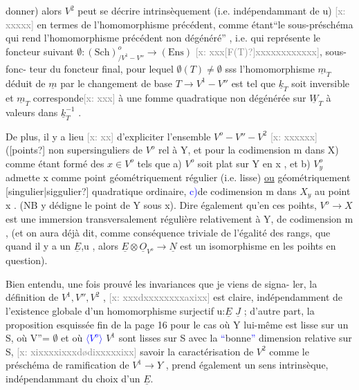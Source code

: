 \documentclass[11pt]{article}
\newcommand{\scanpage}[1]{\par\bigskip\noindent{\small\sffamily[scan #1]}\par}
\newcommand{\mspage}[1]{{\small\sffamily[p.\,#1]}}
\newcommand{\hand}[1]{\textcolor{blue}{#1}}
\newcommand{\inserted}[2][]{\textcolor{blue}{$\langle$#2$\rangle$}}
\newcommand{\xout}[1]{\textcolor{gray}{[\textsf{x:} #1]}}
\newcommand{\uline}[1]{\underline{#1}}
\newcommand{\unsure}[1]{[#1?]}
\begin{document}
\mspage{\hand{169}}

\clearpage
\scanpage{25/170}
\mspage{\hand{5}}
donner) alors $V^2$ peut se décrire intrinsèquement (i.e. indépendammant de u)
\xout{xxxxx} en termes de l'homomorphisme précédent, comme étant``le sous-préschéma
qui rend l'homomorphisme précédent non dégénéré'' , i.e. qui représente le
foncteur suivant $\emptyset : (\mathrm{Sch})^{o}_{/V^1 - V''} \longrightarrow (\mathrm{Ens})$ \xout{xxx\unsure{F(T)}xxxxxxxxxxxx}, sous-fonc-%
teur du foncteur final, pour lequel $\emptyset(T)\neq \emptyset$ sss l'homomorphisme $\underline{m}_T$ déduit
de $\underline{m}$ par le changement de base $T \to V^1 - V''$ est tel que $\underline{k}_T$ soit inversible et
$\underline{m}_T$ corresponde\xout{xxx} à une fomme quadratique non dégénérée sur $\underline{W}_T$ à valeurs dans
$\underline{k}_T^{-1}$ .

De plus, il y a lieu \xout{xx} d'expliciter l'ensemble $V^o - V'' - V^2$ \xout{xxxxxx}
(\unsure{points} non supersinguliers de $V^o$ rel à Y, et pour la codimension m dans X)
comme étant formé des $x \in V^o$ tels que a) $V^o$ soit plat sur Y en x , et
b) $V^o_y$ admette x comme point géométriquement régulier (i.e. lisse) \uline{ou}
géométriquement \unsure{singulier|siggulier} quadratique ordinaire, \hand{c)}de codimension m dans $X_y$
au point x . (NB y dédigne le point de Y sous x). Dire également qu'en ces
poihts, $V^o \longrightarrow X$ est une immersion transversalement régulière relativement à
Y, de codimension m , (et on aura déjà dit, comme conséquence triviale de
l'égalité des rangs, que quand il y a un $\underline{E}$,u , alors $\underline{E}\otimes\underline{O}_{V^o} \to \underline{N}$ est un
isomorphisme en les poihts en question).

Bien entendu, une fois prouvé les invariances que je viens de signa-%
ler, la définition de $V^1, V'', V^2$ , \xout{xxxdxxxxxxxxaxixx} est claire, indépendamment
de l'existence globale d'un homomorphisme surjectif u:$\underline{E}$ \quad $\underline{J}$ ; d'autre part,
la proposition esquissée fin de la page 16 pour le cas où Y lui-même est
lisse sur un S, où V''= $\emptyset$ et où \inserted{$V^o$} $V^1$ sont lisses sur S avec la \hand{``}bonne\hand{''} dimension
relative sur S, \xout{xixxxxixxxdødixxxxxixx} savoir la caractérisation de $V^2$ comme le
préschéma de ramification de $V^1 \longrightarrow Y$ , prend également un sens intrinsèque,
indépendammant du choix d'un $\underline{E}$.
\end{document}

